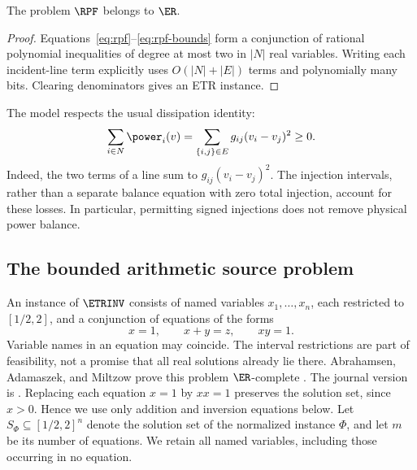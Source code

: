 \begin{proposition}
\label{prop:rpf-membership}
The problem $\RPF$ belongs to $\ER$.
\end{proposition}
\begin{proof}
Equations~\eqref{eq:rpf}--\eqref{eq:rpf-bounds} form a conjunction of rational
polynomial inequalities of degree at most two in $|N|$ real variables.
Writing each incident-line term explicitly uses $O(|N|+|E|)$ terms and
polynomially many bits. Clearing denominators gives an ETR instance.
\end{proof}

The model respects the usual dissipation identity:
\begin{equation}
 \sum_{i\in N}\power_i(v)
 =\sum_{\{i,j\}\in E}g_{ij}(v_i-v_j)^2\ge0.
 \label{eq:dissipation}
\end{equation}
Indeed, the two terms of a line sum to $g_{ij}(v_i-v_j)^2$.
The injection intervals, rather than a separate balance equation with zero
total injection, account for these losses. In particular, permitting signed
injections does not remove physical power balance.

\subsection{The bounded arithmetic source problem}

An instance of $\ETRINV$ consists of named variables $x_1,\ldots,x_n$,
each restricted to $[1/2,2]$, and a conjunction of equations of the forms
\begin{equation}
 x=1,\qquad x+y=z,\qquad xy=1.
 \label{eq:etr-inv}
\end{equation}
Variable names in an equation may coincide. The interval restrictions are
part of feasibility, not a promise that all real solutions already lie there.
Abrahamsen, Adamaszek, and Miltzow prove this problem $\ER$-complete
\citep[Definition 5 and Theorem 7 of the STOC/arXiv version]{AbrahamsenEtAl2018}.
The journal version is \citet{AbrahamsenEtAl2022}.
Replacing each equation $x=1$ by $x x=1$ preserves the solution set, since
$x>0$. Hence we use only addition and inversion equations below.
Let $S_\Phi\subseteq[1/2,2]^n$ denote the solution set of the normalized
instance $\Phi$, and let $m$ be its number of equations.
We retain all named variables, including those occurring in no equation.
